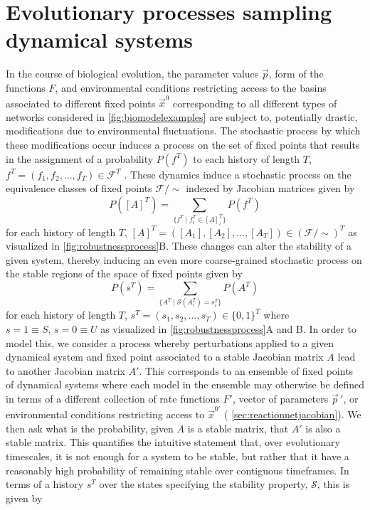 \section{Evolutionary processes sampling dynamical systems}
In the course of biological evolution, the parameter values $\vec{p}$, form of the functions $F$, and environmental conditions restricting access to the basins associated to different fixed points $\vec{x}^0$ corresponding to all different types of networks considered in \ref{fig:biomodelexamples} are subject to, potentially drastic, modifications due to environmental fluctuations. The stochastic process by which these modifications occur induces a process on the set of fixed points that results in the assignment of a probability $P(f^T)$ to each history of length $T$, $f^T = ( f_1,f_2,\ldots,f_T ) \in \mathcal{F}^T$ \cite{RobertM.Gray130}.
These dynamics induce a stochastic process on the equivalence classes of fixed points $\mathcal{F}/{\sim}$ indexed by Jacobian matrices given by
$$
P([A]^T) = \sum_{ \{ f^T \mid f_i^T \in [A]_i^T \} } P(f^T)
$$
for each history of length $T$, $[A]^T = ( [A_1], [A_2], \ldots, [A_T] ) \in (\mathcal{F}/{\sim})^T$
as visualized in \ref{fig:robustnessprocess}B. These changes can alter the stability of a given system, thereby inducing an even more coarse-grained stochastic process on the stable regions of the space of fixed points given by
$$
P(s^T) = \sum_{ \{ A^T \mid \mathcal{S}(A_i^T) = s_i^T \} } P(A^T)
$$
for each history of length $T$, $s^T = ( s_1, s_2, \ldots, s_T ) \in \{0,1\}^T$ where $s=1 \equiv S,\, s=0 \equiv U$ as visualized in \ref{fig:robustnessprocess}A and B. In order to model this, we consider a process whereby perturbations applied to a given dynamical system and fixed point associated to a stable Jacobian matrix $A$ lead to another Jacobian matrix $A'$.  This corresponds to an ensemble of fixed points of dynamical systems where each model in the ensemble may otherwise be defined in terms of a different collection of rate functions $F'$, vector of parameters ${\vec{p}}\,'$, or environmental conditions restricting access to $\vec{x}^{0'}$ ( \ref{sec:reactionnetjacobian}). We then ask what is the probability, given $A$ is a stable matrix, that $A'$ is also a stable matrix. This quantifies the intuitive statement that, over evolutionary timescales, it is not enough for a system to be stable, but rather that it have a reasonably high probability of remaining stable over contiguous timeframes. In terms of a history $s^T$ over the states specifying the stability property, $\mathcal{S}$, this is given by
